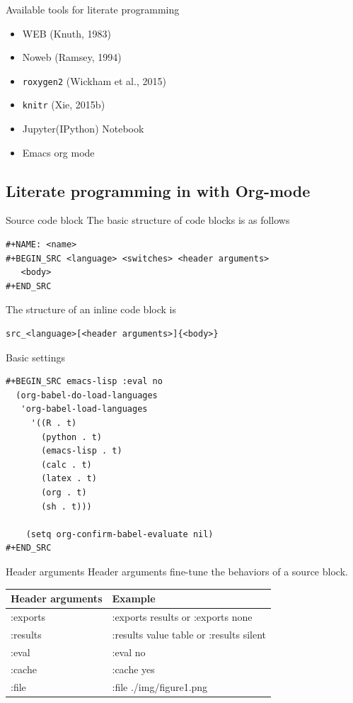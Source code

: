 \documentclass[presentation]{beamer}
\begin{document}
\begin{frame}[fragile,label={sec:org28fafcf}]{Available tools for literate programming}
 \begin{itemize}
\item WEB (Knuth, 1983)
\item Noweb (Ramsey, 1994)
\item \texttt{roxygen2} (Wickham et al., 2015)
\item \texttt{knitr} (Xie, 2015b)
\item Jupyter(IPython) Notebook
\item Emacs org mode
\end{itemize}
\end{frame}


\subsection{Literate programming in with Org-mode}
\label{sec:orgeb05a1a}

\begin{frame}[fragile,label={sec:orgae8d27b}]{Source code block}
 The basic structure of code blocks is as follows

\begin{verbatim}
#+NAME: <name>
#+BEGIN_SRC <language> <switches> <header arguments>
   <body>
#+END_SRC
\end{verbatim}

The structure of an inline code block is

\begin{verbatim}
src_<language>[<header arguments>]{<body>}
\end{verbatim}
\end{frame}

\begin{frame}[fragile,label={sec:org65e6573}]{Basic settings}
 \begin{verbatim}
#+BEGIN_SRC emacs-lisp :eval no
  (org-babel-do-load-languages
   'org-babel-load-languages
     '((R . t)
       (python . t)
       (emacs-lisp . t)
       (calc . t)
       (latex . t)
       (org . t)
       (sh . t)))

    (setq org-confirm-babel-evaluate nil)
#+END_SRC
\end{verbatim}
\end{frame}

\begin{frame}[label={sec:org69fe373}]{Header arguments}
Header arguments fine-tune the behaviors of a source block.

\begin{center}
\begin{tabular}{ll}
Header arguments & Example\\
\hline
:exports & :exports results or :exports none\\
:results & :results value table or :results silent\\
:eval & :eval no\\
:cache & :cache yes\\
:file & :file ./img/figure1.png\\
\end{tabular}
\end{center}
\end{frame}
\end{document}
